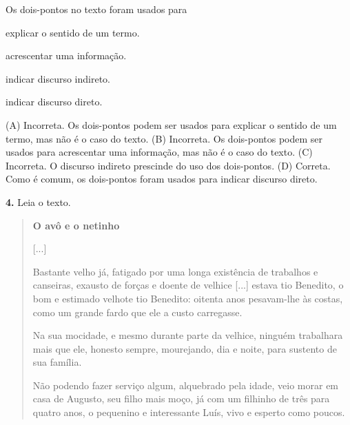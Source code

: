 Os dois-pontos no texto foram usados para

\begin{escolha}
\item explicar o sentido de um termo.

\item acrescentar uma informação.

\item indicar discurso indireto.

\item indicar discurso direto.
\end{escolha}


(A) Incorreta. Os dois-pontos podem ser usados para explicar o sentido de um termo, mas não é o caso do texto.
(B) Incorreta. Os dois-pontos podem ser usados para acrescentar uma informação, mas não é o caso do texto.
(C) Incorreta. O discurso indireto prescinde do uso dos dois-pontos.
(D) Correta. Como é comum, os dois-pontos foram usados para indicar discurso direto.

\textbf{4.} Leia o texto.

\begin{quote}
\textbf{O avô e o netinho}

{[}...{]}

Bastante velho já, fatigado por uma longa existência de trabalhos e
canseiras, exausto de forças e doente de velhice {[}...{]} estava tio Benedito, o bom e estimado velhote tio
Benedito: oitenta anos pesavam-lhe às costas, como um grande fardo que
ele a custo carregasse.

Na sua mocidade, e mesmo durante parte da velhice, ninguém trabalhara
mais que ele, honesto sempre, mourejando, dia e noite, para sustento de
sua família.

Não podendo fazer serviço algum, alquebrado pela idade, veio morar em
casa de Augusto, seu filho mais moço, já com um filhinho de três para
quatro anos, o pequenino e interessante Luís, vivo e esperto como
poucos.

\end{quote}

